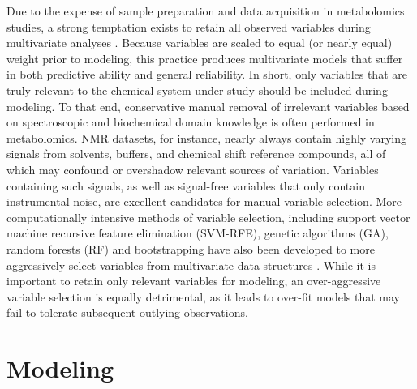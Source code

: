 \begin{doublespace}
Due to the expense of sample preparation and data acquisition in metabolomics
studies, a strong temptation exists to retain all observed variables during
multivariate analyses \cite{kjeldahl:jchemo2010}. Because variables are scaled
to equal (or nearly equal) weight prior to modeling, this practice produces
multivariate models that suffer in both predictive ability and general
reliability. In short, only variables that are truly relevant to the chemical
system under study should be included during modeling. To that end,
conservative manual removal of irrelevant variables based on spectroscopic
and biochemical domain knowledge is often performed in metabolomics. \hnmr{}
NMR datasets, for instance, nearly always contain highly varying signals from
solvents, buffers, and chemical shift reference compounds, all of which may
confound or overshadow relevant sources of variation. Variables containing
such signals, as well as signal-free variables that only contain instrumental
noise, are excellent candidates for manual variable selection. More
computationally intensive methods of variable selection, including support
vector machine recursive feature elimination (SVM-RFE), genetic algorithms
(GA), random forests (RF) and bootstrapping have also been developed to more
aggressively select variables from multivariate data structures
\cite{lin:metab2011,wongravee:anchem2009}. While it is important to retain
only relevant variables for modeling, an over-aggressive variable selection
is equally detrimental, as it leads to over-fit models that may fail to
tolerate subsequent outlying observations.
\end{doublespace}

\section{Modeling}


